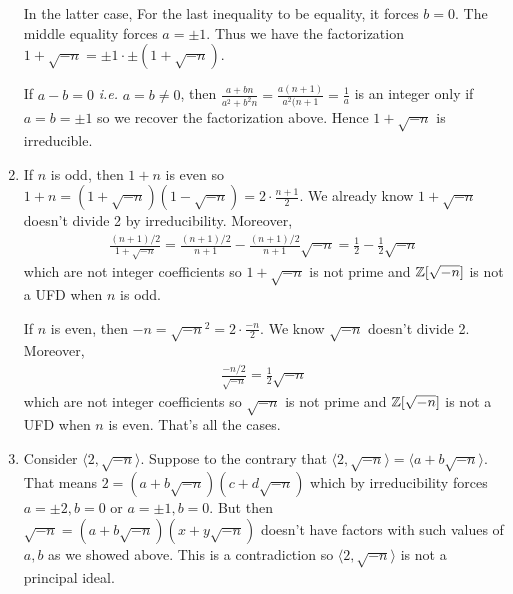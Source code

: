 \documentclass[12pt,class=article,crop=false]{standalone}
\begin{document}
\begin{problem}[4]
\begin{enumerate}[label=(\alph*)]
In the latter case, For the last inequality to be equality, it forces $ b=0$. The middle equality forces $ a = \pm 1$. Thus we have the factorization $ 1+\sqrt{-n} = \pm 1 \cdot \pm ( 1+\sqrt{-n} ) $.

If $ a-b=0$  \emph{i.e.} $ a=b \neq 0$, then  $ \frac{a+bn}{ a^2+b^2n} = \frac{a(n+1)}{a^2(n+1} = \frac{1}{a}$ is an integer only if $ a =b = \pm 1$ so we recover the factorization above. Hence  $ 1+\sqrt{-n} $ is irreducible.
\item If $ n$ is odd,  then $ 1+n$ is even  so $ 1+n = (1+\sqrt{-n} )(1-\sqrt{-n}) = 2 \cdot \frac{n+1}{ 2}$. We already know $ 1+\sqrt{-n} $ doesn't divide 2 by irreducibility. Moreover,
	\begin{align*}
		\frac{(n+1) /2}{1+\sqrt{-n} } = \frac{(n+1) /2}{ n+1} - \frac{(n+1) /2}{n+1 } \sqrt{-n} = \frac{1}{2} - \frac{1}{2} \sqrt{-n}  
	\end{align*}
	which are not integer coefficients so $ 1+\sqrt{-n}$ is not prime and $ \mathbb{Z}[\sqrt{-n} ]$ is not a UFD when $ n$ is odd.

	If $ n$ is even, then  $ -n = \sqrt{-n}^2 = 2 \cdot \frac{-n}{ 2}$. We know $ \sqrt{-n} $ doesn't divide 2. Moreover,
	\begin{align*}
		\frac{-n /2 }{ \sqrt{-n} } = \frac{1}{2} \sqrt{-n} 
	\end{align*}
	which are not integer coefficients so $ \sqrt{-n} $ is not prime and $ \mathbb{Z}[\sqrt{-n} ]$ is not a UFD when $ n$ is even. That's all the cases.
\item Consider $ \langle 2, \sqrt{-n}  \rangle$. Suppose to the contrary that $ \langle 2, \sqrt{-n}  \rangle = \langle a+b\sqrt{-n}  \rangle$. That means $ 2 = (a+b\sqrt{-n} )(c+d\sqrt{-n} )$ which by irreducibility forces $ a=\pm 2,b=0$ or  $ a=\pm 1,b=0$. But then $ \sqrt{-n} = (a+b\sqrt{-n} ) (x+y\sqrt{-n} )$ doesn't have factors with such values of $ a,b$ as we showed above. This is a contradiction so  $ \langle 2, \sqrt{-n}  \rangle$ is not a principal ideal.
\end{enumerate}
\end{problem}
\end{document}
